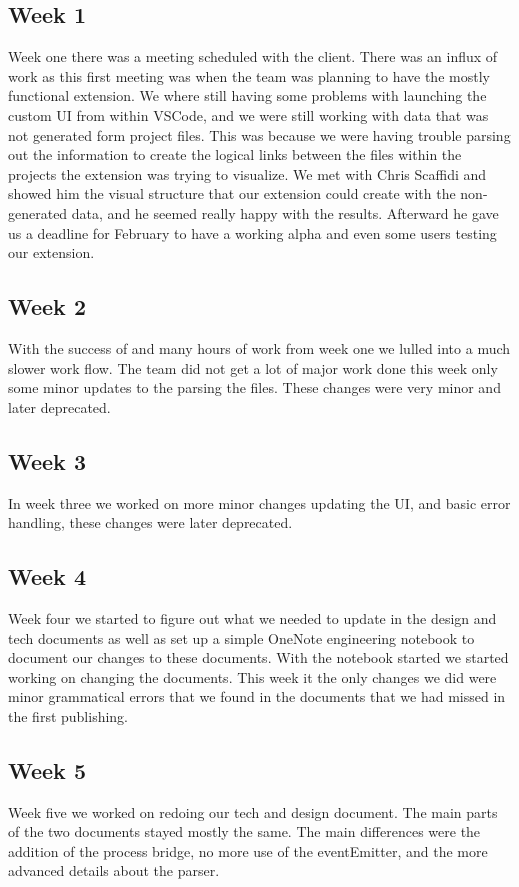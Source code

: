 \documentclass[letterpaper,10pt,titlepage,draftclsnofoot,onecolumn,onesided] {IEEEtran}
\begin{document}
	\subsection{Week 1}
	Week one there was a meeting scheduled with the client. 
	There was an influx of work as this first meeting was when the team was planning to have the mostly functional extension. 
	We where still having some problems with launching the custom UI from within VSCode, and we were still working with data that was not generated form project files.
	This was because we were having trouble parsing out the information to create the logical links between the files within the projects the extension was trying to visualize. 
	We met with Chris Scaffidi and showed him the visual structure that our extension could create with the non-generated data, and he seemed really happy with the results.
	Afterward he gave us a deadline for February to have a working alpha and even some users testing our extension. 
	
	\subsection{Week 2}
	With the success of and many hours of work from week one we lulled into a much slower work flow. 
	The team did not get a lot of major work done this week only some minor updates to the parsing the files. 
	These changes were very minor and later deprecated.

	\subsection{Week 3}
	In week three we worked on more minor changes updating the UI, and basic error handling, these changes were later deprecated. 

	\subsection{Week 4}
	Week four we started to figure out what we needed to update in the design and tech documents as well as set up a simple OneNote engineering notebook to document our changes to these documents.
	With the notebook started we started working on changing the documents. 
	This week it the only changes we did were minor grammatical errors that we found in the documents that we had missed in the first publishing.

	\subsection{Week 5}
	Week five we worked on redoing our tech and design document.
	The main parts of the two documents stayed mostly the same. 
	The main differences were the addition of the process bridge, no more use of the eventEmitter, and the more advanced details about the parser. 
	
\end{document}
